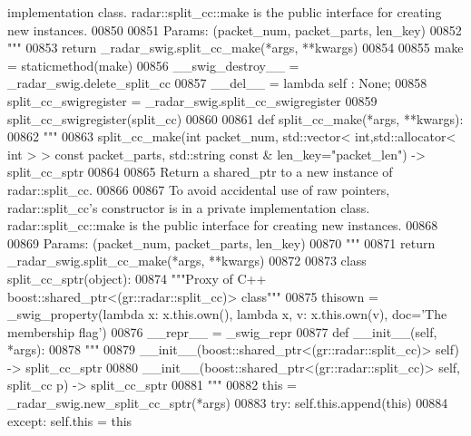 \begin{DoxyCode}
{{{{{{       implementation class. radar::split\_cc::make is the public interface for creating new instances.}
00850 \textcolor{stringliteral}{}
00851 \textcolor{stringliteral}{        Params: (packet\_num, packet\_parts, len\_key)}
00852 \textcolor{stringliteral}{        """}
00853         \textcolor{keywordflow}{return} \_radar\_swig.split\_cc\_make(*args, **kwargs)
00854 
00855     make = staticmethod(make)
00856     \_\_swig\_destroy\_\_ = \_radar\_swig.delete\_split\_cc
00857     \_\_del\_\_ = \textcolor{keyword}{lambda} self : \textcolor{keywordtype}{None};
00858 split\_cc\_swigregister = \_radar\_swig.split\_cc\_swigregister
00859 split_cc_swigregister(split\_cc)
00860 
00861 \textcolor{keyword}{def }split_cc_make(*args, **kwargs):
00862   \textcolor{stringliteral}{"""}
00863 \textcolor{stringliteral}{    split\_cc\_make(int packet\_num, std::vector< int,std::allocator< int > > const packet\_parts, std::string
       const & len\_key="packet\_len") -> split\_cc\_sptr}
00864 \textcolor{stringliteral}{}
00865 \textcolor{stringliteral}{    Return a shared\_ptr to a new instance of radar::split\_cc.}
00866 \textcolor{stringliteral}{}
00867 \textcolor{stringliteral}{    To avoid accidental use of raw pointers, radar::split\_cc's constructor is in a private implementation
       class. radar::split\_cc::make is the public interface for creating new instances.}
00868 \textcolor{stringliteral}{}
00869 \textcolor{stringliteral}{    Params: (packet\_num, packet\_parts, len\_key)}
00870 \textcolor{stringliteral}{    """}
00871   \textcolor{keywordflow}{return} \_radar\_swig.split\_cc\_make(*args, **kwargs)
00872 
00873 \textcolor{keyword}{class }split_cc_sptr(object):
00874     \textcolor{stringliteral}{"""Proxy of C++ boost::shared\_ptr<(gr::radar::split\_cc)> class"""}
00875     thisown = _swig_property(\textcolor{keyword}{lambda} x: x.this.own(), \textcolor{keyword}{lambda} x, v: x.this.own(v), doc=\textcolor{stringliteral}{'The membership flag'})
00876     \_\_repr\_\_ = \_swig\_repr
00877     \textcolor{keyword}{def }__init__(self, *args): 
00878         \textcolor{stringliteral}{"""}
00879 \textcolor{stringliteral}{        \_\_init\_\_(boost::shared\_ptr<(gr::radar::split\_cc)> self) -> split\_cc\_sptr}
00880 \textcolor{stringliteral}{        \_\_init\_\_(boost::shared\_ptr<(gr::radar::split\_cc)> self, split\_cc p) -> split\_cc\_sptr}
00881 \textcolor{stringliteral}{        """}
00882         this = \_radar\_swig.new\_split\_cc\_sptr(*args)
00883         \textcolor{keywordflow}{try}: self.this.append(this)
00884         \textcolor{keywordflow}{except}: self.this = this
}}}}}
\end{DoxyCode}
